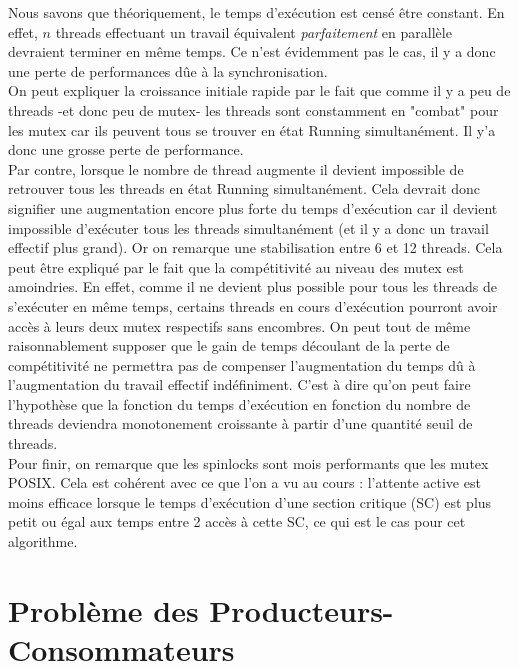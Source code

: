 \noindent Nous savons que théoriquement, le temps d'exécution est censé être constant. En effet, $n$ threads effectuant un travail équivalent \textit{parfaitement} en parallèle devraient terminer en même temps. Ce n'est évidemment pas le cas, il y a donc une perte de performances dûe à la synchronisation.\\

\noindent On peut expliquer la croissance initiale rapide par le fait que comme il y a peu de threads -et donc peu de mutex- les threads sont constamment en "combat" pour les mutex car ils peuvent tous se trouver en état Running simultanément. Il y'a donc une grosse perte de performance.\\

\noindent Par contre, lorsque le nombre de thread augmente il devient impossible de retrouver tous les threads en état Running simultanément. Cela devrait donc signifier une augmentation encore plus forte du temps d'exécution car il devient impossible d'exécuter tous les threads simultanément (et il y a donc un travail effectif plus grand). Or on remarque une stabilisation entre 6 et 12 threads. Cela peut être expliqué par le fait que la compétitivité au niveau des mutex est amoindries. En effet, comme il ne devient plus possible pour tous les threads de s'exécuter en même temps, certains threads en cours d'exécution pourront avoir accès à leurs deux mutex respectifs sans encombres. On peut tout de même raisonnablement supposer que le gain de temps découlant de la perte de compétitivité ne permettra pas de compenser l'augmentation du temps dû à l'augmentation du travail effectif indéfiniment. C'est à dire qu'on peut faire l'hypothèse que la fonction du temps d'exécution en fonction du nombre de threads deviendra monotonement croissante à partir d'une quantité seuil de threads.\\

\noindent Pour finir, on remarque que les spinlocks sont mois performants que les mutex POSIX. Cela est cohérent avec ce que l'on a vu au cours : l'attente active est moins efficace lorsque le temps d'exécution d'une section critique (SC) est plus petit ou égal aux temps entre 2 accès à cette SC, ce qui est le cas pour cet algorithme.

\section{Problème des Producteurs-Consommateurs}

